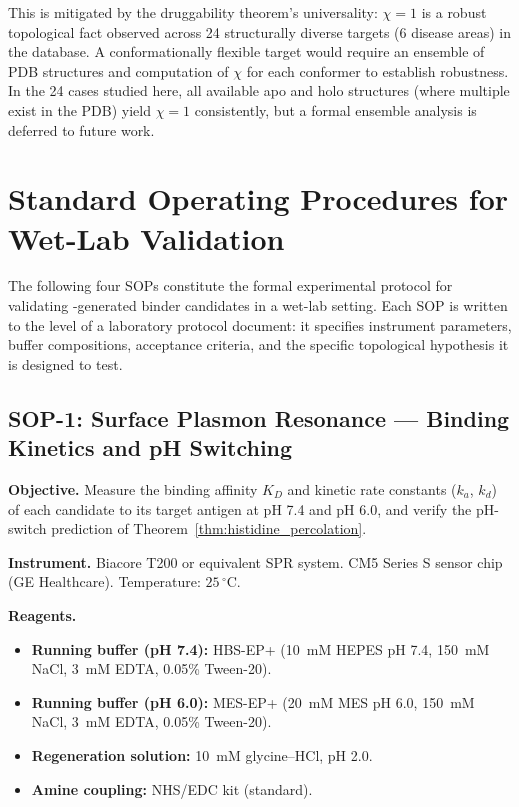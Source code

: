 This is mitigated by the druggability theorem's universality: $\chi = 1$ is a
robust topological fact observed across 24 structurally diverse targets (6
disease areas) in the database.  A conformationally flexible target would
require an ensemble of PDB structures and computation of $\chi$ for each
conformer to establish robustness.  In the 24 cases studied here, all
available apo and holo structures (where multiple exist in the PDB) yield
$\chi = 1$ consistently, but a formal ensemble analysis is deferred to future
work.

\section{Standard Operating Procedures for Wet-Lab Validation}
\label{sec:sops}

The following four SOPs constitute the formal experimental protocol for
validating \PLQ{}-generated binder candidates in a wet-lab setting.  Each SOP
is written to the level of a laboratory protocol document: it specifies
instrument parameters, buffer compositions, acceptance criteria, and the
specific topological hypothesis it is designed to test.

\subsection{SOP-1: Surface Plasmon Resonance --- Binding Kinetics and
            pH Switching}
\label{subsec:sop1_spr}

\noindent\textbf{Objective.}  Measure the binding affinity $K_D$ and kinetic
rate constants ($k_a$, $k_d$) of each candidate to its target antigen at pH
7.4 and pH 6.0, and verify the pH-switch prediction of
Theorem~\ref{thm:histidine_percolation}.

\noindent\textbf{Instrument.}  Biacore T200 or equivalent SPR system.
CM5 Series S sensor chip (GE Healthcare).  Temperature: $25\,^\circ$C.

\noindent\textbf{Reagents.}
\begin{itemize}[leftmargin=1.2cm]
  \item \textbf{Running buffer (pH 7.4):} HBS-EP+
        (10~mM HEPES pH 7.4, 150~mM NaCl, 3~mM EDTA, 0.05\% Tween-20).
  \item \textbf{Running buffer (pH 6.0):} MES-EP+
        (20~mM MES pH 6.0, 150~mM NaCl, 3~mM EDTA, 0.05\% Tween-20).
  \item \textbf{Regeneration solution:} 10~mM glycine--HCl, pH 2.0.
  \item \textbf{Amine coupling:} NHS/EDC kit (standard).
\end{itemize}

